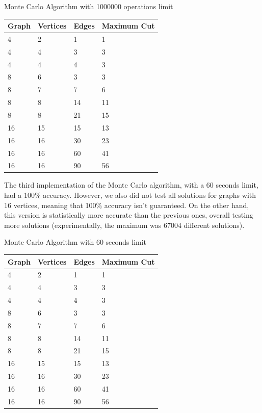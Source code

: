 \documentclass[]{revdetua}
\begin{document}
\begin{table}[!ht]
    \centering
    Monte Carlo Algorithm with 1000000 operations limit
    \begin{tabular}{|l|l|l|l|}
    \hline
        Graph & Vertices & Edges & Maximum Cut \\ \hline
        4 & 2 & 1 & 1 \\ \hline
        4 & 4 & 3 & 3 \\ \hline
        4 & 4 & 4 & 3 \\ \hline
        8 & 6 & 3 & 3 \\ \hline
        8 & 7 & 7 & 6 \\ \hline
        8 & 8 & 14 & 11 \\ \hline
        8 & 8 & 21 & 15 \\ \hline
        16 & 15 & 15 & 13 \\ \hline
        16 & 16 & 30 & 23 \\ \hline
        16 & 16 & 60 & 41 \\ \hline
        16 & 16 & 90 & 56 \\ \hline
    \end{tabular}
\end{table}

The third implementation of the Monte Carlo algorithm, with a 60 seconds limit, had a 100\% accuracy. However, we also did not test all solutions for graphs with 16 vertices, meaning that 100\% accuracy isn't guaranteed. On the other hand, this version is statistically more accurate than the previous ones, overall testing more solutions (experimentally, the maximum was 67004 different solutions).

\begin{table}[!ht]
    \centering
    Monte Carlo Algorithm with 60 seconds limit
    \begin{tabular}{|l|l|l|l|}
    \hline
        Graph & Vertices & Edges & Maximum Cut \\ \hline
        4 & 2 & 1 & 1 \\ \hline
        4 & 4 & 3 & 3 \\ \hline
        4 & 4 & 4 & 3 \\ \hline
        8 & 6 & 3 & 3 \\ \hline
        8 & 7 & 7 & 6 \\ \hline
        8 & 8 & 14 & 11 \\ \hline
        8 & 8 & 21 & 15 \\ \hline
        16 & 15 & 15 & 13 \\ \hline
        16 & 16 & 30 & 23 \\ \hline
        16 & 16 & 60 & 41 \\ \hline
        16 & 16 & 90 & 56 \\ \hline
    \end{tabular}
\end{table}
\end{document}
